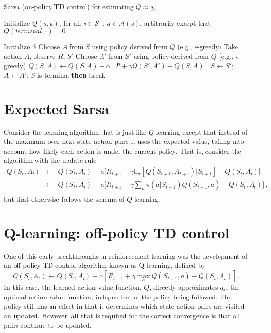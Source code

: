 \documentclass[12pt]{book}
\newcommand{\<}{\langle}
\renewcommand{\>}{\rangle}
\renewcommand{\S}{\mathcal{S}}
\newcommand{\A}{\mathcal{A}}
\newcommand{\E}{\mathbb{E}}
\begin{document}
\begin{algorithm}
\caption{Sarsa (on-policy TD control) for estimating $Q\approx q_*$}
\begin{algorithmic}
\State Initialize $Q(s,a)$, for all $s\in\S^+$, $a\in\A(s)$, arbitrarily except that $Q(terminal,\cdot)=0$

\medskip
{}
  \State Initialize $S$
  \State Choose $A$ from $S$ using policy derived from $Q$ (e.g., $\epsilon$-greedy)
    \State Take action $A$, observe $R$, $S'$
    \State Choose $A'$ from $S'$ using policy derived from $Q$ (e.g., $\epsilon$-greedy)
    \State $Q(S,A)\leftarrow Q(S,A) + \alpha [R + \gamma Q(S',A') - Q(S,A)]$
    \State $S\leftarrow S'$; $A\leftarrow A'$;
     $S$ is terminal {\bf then} break
  \EndFor
\EndFor
\end{algorithmic}
\end{algorithm}

%
%
%

\section{Expected Sarsa}

Consider the learning algorithm that is just like $Q$-learning except that instead of the maximum over next state-action pairs it uses the expected value, taking into account how likely each action is under the current policy. That is, consider the algorithm with the update rule
\begin{eqnarray*}
Q(S_t,A_t) 
& \leftarrow & 
Q(S_t,A_t) + \alpha \Big[ R_{t+1} + \gamma \E_\pi[Q(S_{t+1},A_{t+1}) | S_{t+1}] - Q(S_t,A_t) \Big] \\
& \leftarrow &
Q(S_t,A_t) + \alpha \Big[ R_{t+1} + \gamma \sum_a \pi(a|S_{t+1}) Q(S_{t+1},a) - Q(S_t,A_t) \Big]\,, \\
\end{eqnarray*}
but that otherwise follows the schema of $Q$-learning. 

%
%
%

\section{Q-learning: off-policy TD control}

One of this early breakthroughs in reinforcement learning was the development of an off-policy TD control algorithm known as Q-learning, defined by
\begin{equation}
Q(S_t,A_t) \leftarrow Q(S_t,A_t) + \alpha[ R_{t+1} + \gamma \max_a Q(S_{t+1},a) - Q(S_t,A_t)]\,.
\end{equation}
In this case, the learned action-value function, $Q$, directly approximates $q_*$, the optimal action-value function, independent of the policy being followed. The policy still has an effect in that it determines which state-action pairs are visited an updated. However, all that is required for the correct convergence is that all pairs continue to be updated.
\end{document}
